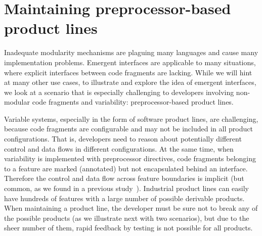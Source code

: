 
\section{Maintaining preprocessor-based product lines}
\label{sec:motivating}

Inadequate modularity mechanisms are plaguing many languages and cause many implementation problems. Emergent interfaces are applicable to many situations, where explicit interfaces between code fragments are lacking. While we will hint at many other use cases, to illustrate and explore the idea of emergent interfaces, we look at a scenario that is especially challenging to developers involving non-modular code fragments and variability: preprocessor-based product lines.

Variable systems, especially in the form of software product lines, are challenging, because code fragments are configurable and may not be included in all product configurations. That is, developers need to reason about potentially different control and data flows in different configurations. At the same time, when variability is implemented with preprocessor directives, code fragments belonging to a feature are marked (annotated) but not encapsulated behind an interface. Therefore the control and data flow across feature boundaries is implicit (but common, as we found in a previous study~\cite{ribeiro-feature-dependencies-gpce11}).
Industrial product lines can easily have hundreds of features with a large number of possible derivable products. When maintaining a product line, the developer must be sure not to break any of the possible products (as we illustrate next with two scenarios), but due to the sheer number of them, rapid feedback by testing is not possible for all products.


